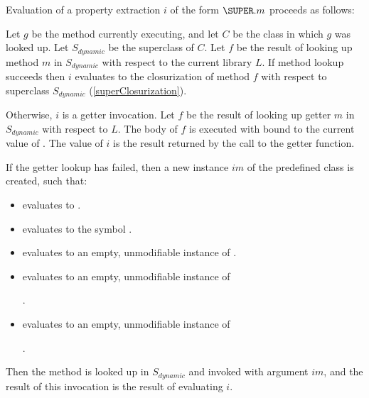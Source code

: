 \documentclass{article}
\begin{document}
\LMHash{}
Evaluation of a property extraction $i$ of the form $\SUPER.m$ proceeds as follows:

\LMHash{}
Let $g$ be the method currently executing, and let $C$ be the class in which $g$ was looked up.
Let $S_{dynamic}$ be the superclass of $C$.
Let $f$ be the result of looking up method $m$ in $S_{dynamic}$ with respect to the current library $L$.
If method lookup succeeds then $i$ evaluates to the closurization of method $f$ with respect to superclass $S_{dynamic}$ (\ref{superClosurization}).

\LMHash{}
Otherwise, $i$ is a getter invocation.
Let $f$ be the result of looking up getter $m$ in $S_{dynamic}$ with respect to $L$.
The body of $f$ is executed with \THIS{} bound to the current value of \THIS{}.
The value of $i$ is the result returned by the call to the getter function.

\LMHash{}
If the getter lookup has failed, then a new instance $im$ of the predefined class  is created, such that:
\begin{itemize}
\item {} evaluates to \code{\TRUE{}}.
\item {} evaluates to the symbol .
\item {} evaluates to an empty, unmodifiable instance of
.
\item {} evaluates to an empty, unmodifiable instance of

.
\item {} evaluates to an empty, unmodifiable instance of

.
\end{itemize}

\LMHash{}
Then the method  is looked up in $S_{dynamic}$ and invoked with argument $im$, and the result of this invocation is the result of evaluating $i$.

%
\end{document}
